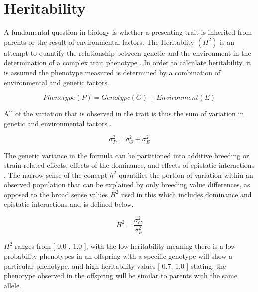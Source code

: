 \documentclass[a4paper,11pt,twoside]{book}
\begin{document}
	
	\section{Heritability}
	
	A fundamental question in biology is whether a presenting trait is inherited from parents or the result of environmental factors. The Heritablity $(H^2)$ is an attempt to quantify the relationship between genetic and the environment in the determination of a complex trait phenotype \citep{Visscher2008Heritabilitymisconceptions}. In order to calculate heritability, it is assumed the phenotype measured is determined by a combination of environmental and genetic factors. 

	\begin{equation} \label{eq1}
	Phenotype (P) = Genotype (G) + Environment (E) 
	\end{equation}

	All of the variation that is observed in the trait is thus the sum of variation in genetic and environmental factors  \citep{Visscher2008Heritabilitymisconceptions}.

	\begin{equation} \label{eq2}
	 \sigma_P^2 = \sigma_G^2 + \sigma_E^2
	\end{equation}
		
    The genetic variance in the formula can be partitioned into additive breeding or strain-related effects, effects of the dominance, and effects of epistatic interactions \citep{Visscher2008Heritabilitymisconceptions}. The narrow sense of the concept $h^2$ quantifies the portion of variation within an observed population that can be explained by only breeding value differences, as opposed to the broad sense values $H^2$ used in this which includes dominance and epistatic interactions and is defined below.
	
\begin{equation} \label{eq3}
H^2 = \dfrac{\sigma_G^2}{\sigma_P^2} 
\end{equation}
	

    $H^2$ ranges from [ 0.0 , 1.0 ], with the low heritability meaning there is a low probability phenotypes in an offspring with a specific genotype will show a particular phenotype, and high heritability values [ 0.7, 1.0 ] stating, the phenotype observed in the offspring will be similar to parents with the same allele.  
	
\end{document}
